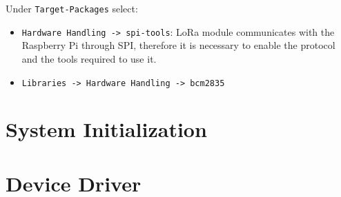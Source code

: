 Under \verb|Target-Packages| select:
\begin{itemize}
	\item \verb|Hardware Handling -> spi-tools|: LoRa module communicates with the Raspberry Pi through SPI, therefore it is necessary to enable the protocol and the tools required to use it.
	\item \verb|Libraries -> Hardware Handling -> bcm2835|
	
\end{itemize}

\clearpage
\section{System Initialization}

\clearpage
\section{Device Driver}